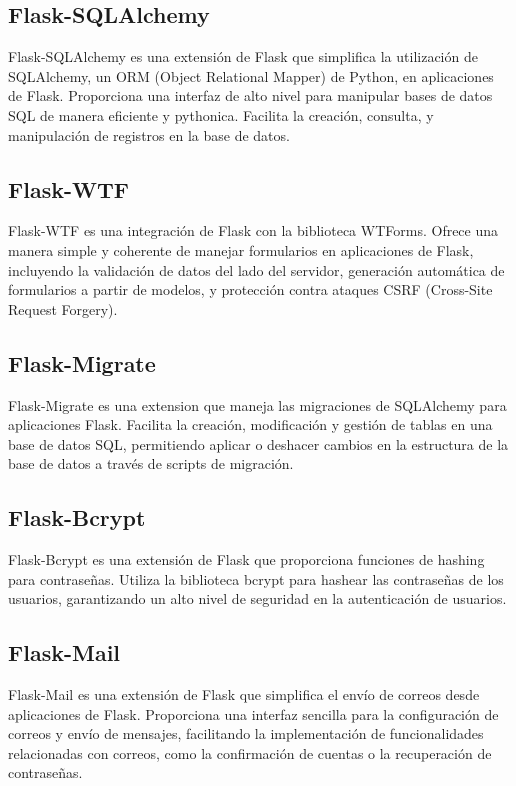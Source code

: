 \documentclass[a4paper, 12pt]{book}
\begin{document}
\subsection{Flask-SQLAlchemy}
\label{subsec:flasksqlalchemy} Flask-SQLAlchemy es una extensión de Flask que simplifica la utilización de SQLAlchemy, un ORM (Object Relational Mapper) 
de Python, en aplicaciones de Flask. Proporciona una interfaz de alto nivel para manipular bases de datos SQL de manera eficiente y pythonica. 
Facilita la creación, consulta, y manipulación de registros en la base de datos.

\subsection{Flask-WTF}
\label{subsec:flaskwtf} Flask-WTF es una integración de Flask con la biblioteca WTForms. Ofrece una manera simple y coherente de manejar formularios en 
aplicaciones de Flask, incluyendo la validación de datos del lado del servidor, generación automática de formularios a partir de modelos, y protección 
contra ataques CSRF (Cross-Site Request Forgery).

\subsection{Flask-Migrate}
\label{subsec:flaskmigrate} Flask-Migrate es una extension que maneja las migraciones de SQLAlchemy para aplicaciones Flask. Facilita la creación, modificación 
y gestión de tablas en una base de datos SQL, permitiendo aplicar o deshacer cambios en la estructura de la base de datos a través de scripts de migración.

\subsection{Flask-Bcrypt}
\label{subsec:flaskbcrypt} Flask-Bcrypt es una extensión de Flask que proporciona funciones de hashing para contraseñas. Utiliza la biblioteca bcrypt para hashear 
las contraseñas de los usuarios, garantizando un alto nivel de seguridad en la autenticación de usuarios.

\subsection{Flask-Mail}
\label{subsec:flaskmail} Flask-Mail es una extensión de Flask que simplifica el envío de correos desde aplicaciones de Flask. Proporciona una interfaz sencilla 
para la configuración de correos y envío de mensajes, facilitando la implementación de funcionalidades relacionadas con correos, como la confirmación de cuentas 
o la recuperación de contraseñas.
\end{document}
